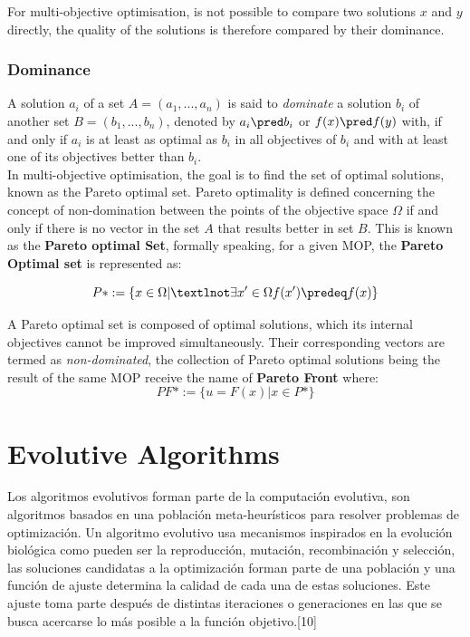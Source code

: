 For multi-objective optimisation, is not possible to compare two solutions $x$ and $y$ directly, the quality of the solutions is therefore compared by their dominance.\\

\subsubsection{Dominance}

A solution $a_i$ of a set $A = (a_1,...,a_n)$ is said to \textit{dominate} a solution $b_i$ of another set $B = (b_1,...,b_n)$, denoted by $a_i \pred b_i$ or $f(x) \pred f(y)$ with, if and only if $a_i$ is at least as optimal as $b_i$ in all objectives of $b_i$ and with at least one of its objectives better than $b_i$.\\

In multi-objective optimisation, the goal is to find the set of optimal solutions, known as the Pareto optimal set. Pareto optimality is defined concerning the concept of non-domination between the points of the objective space $\Omega$ if and only if there is no vector in the set $A$ that results better in set $B$. This is known as the \textbf{Pareto optimal Set}, formally speaking, for a given MOP, the \textbf{Pareto Optimal set} is represented as:

\begin{equation}
    P* := \{x \in \Omega | ¬\exists x' \in \Omega f(x') \predeq f(x) \}
\end{equation}

A Pareto optimal set is composed of optimal solutions, which its internal objectives cannot be improved simultaneously. Their corresponding vectors are termed as \textit{non-dominated}, the collection of Pareto optimal solutions being the result of the same MOP receive the name of \textbf{Pareto Front} where:
\begin{equation}
    PF* := \{u= F(x) | x \in P*\}
\end{equation}


\section{Evolutive Algorithms}

Los algoritmos evolutivos forman parte de la computación evolutiva, son algoritmos basados en una población meta-heurísticos para resolver problemas de optimización. Un algoritmo evolutivo usa mecanismos inspirados en la evolución biológica como pueden ser la reproducción, mutación, recombinación y selección, las soluciones candidatas a la optimización forman parte de una población y una función de ajuste determina la calidad de cada una de estas soluciones. Este ajuste toma parte después de distintas iteraciones o generaciones en las que se busca acercarse lo más posible a la función objetivo.[10] \\

